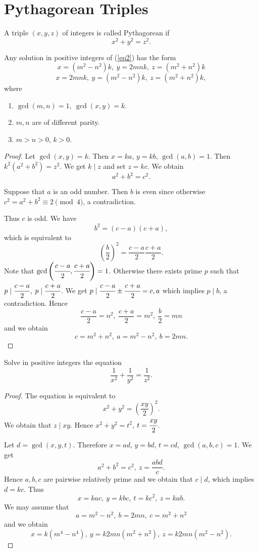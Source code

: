 \section{Pythagorean Triples}
A triple $(x,y,z)$ of integers is called Pythagorean if
\begin{equation}
x^2+y^2=z^2. \label{eq2}
\end{equation}

\begin{thm}
Any solution in positive integers of (\ref{eq2}) has the form
$$x=(m^2-n^2)k , \ y=2mnk, \ z=(m^2+n^2)k$$
$$x=2mnk, \ y=(m^2-n^2)k,\ z=(m^2+n^2)k, $$
where
\begin{enumerate}
\item $\gcd(m,n)=1, \ \gcd(x,y)=k.$
\item $m,n$ are of different parity.
\item $m>n>0$, $k>0$.
\end{enumerate}
\end{thm}

\begin{proof}
Let $\gcd(x,y)=k$. Then $x=ka$, $y=kb$, $\gcd(a,b)=1$. Then
$k^2(a^2+b^2)=z^2$. We get $k\mid z$ and set $z=kc$. We obtain
$$a^2+b^2=c^2.$$

Suppose that $a$ is an odd number. Then $b$ is even since otherwise
$c^2=a^2+b^2 \equiv 2 \pmod{4}$, a contradiction.

Thus $c$ is odd. We have
$$b^2=(c-a)(c+a), $$
which is equivalent to
$$\left( \frac{b}{2}\right)^2=\frac{c-a}{2} \frac{c+a}{2} .$$
Note that $\gcd\left( \cfrac{c-a}{2},\cfrac{c+a}{2}\right) =1$.
Otherwise there exists prime $p$ such that $p\mid \cfrac{c-a}{2}$,
$p\mid \cfrac{c+a}{2}$. We get $p\mid \cfrac{c-a}{2}\pm
\cfrac{c+a}{2}=c,a$ which implies $p\mid b$, a contradiction. Hence
$$\frac{c-a}{2}=n^2, \ \frac{c+a}{2}=m^2,\ \frac{b}{2}=mn $$
and we obtain
$$c=m^2+n^2, \ a=m^2-n^2, \ b=2mn. $$
\end{proof}

\begin{prb}
Solve in positive integers the equation
$$\frac{1}{x^2}+\frac{1}{y^2}=\frac{1}{z^2}. $$
\end{prb}

\begin{proof}
The equation is equivalent to
$$x^2+y^2=\left( \frac{xy}{2}\right)^2. $$
We obtain that $z\mid xy$. Hence $x^2+y^2=t^2$, $t=\cfrac{xy}{2}$.

Let $d=\gcd(x,y,t)$. Therefore $x=ad$, $y=bd$, $t=cd$,
$\gcd(a,b,c)=1$. We get
$$a^2+b^2=c^2, \ z=\frac{abd}{c}. $$
Hence $a,b,c$ are pairwise relatively prime and we obtain that
$c\mid d$, which implies $d=kc$. Thus
$$x=kac, \ y=kbc, \ t=kc^2, \ z=kab. $$
We may assume that
$$a=m^2-n^2, \ b=2mn, \ c=m^2+n^2 $$
and we obtain
$$x=k(m^4-n^4), \ y=k2mn(m^2+n^2), \ z=k2mn(m^2-n^2). $$
\end{proof}
